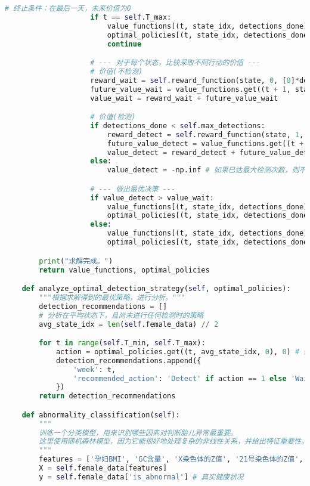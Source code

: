 \documentclass[UTF8, a4paper, 11pt]{ctexart}
\begin{document}
\begin{lstlisting}[language=Python, caption={问题四的解决方案脚本。}]
                    # 终止条件：在最后一天，未来价值为0
                    if t == self.T_max:
                        value_functions[(t, state_idx, detections_done)] = 0
                        optimal_policies[(t, state_idx, detections_done)] = 0 # 结束时不检测
                        continue

                    # --- 对于每个状态，比较采取不同行动的价值 ---
                    # 价值(不检测)
                    reward_wait = self.reward_function(state, 0, [0]*detections_done)
                    future_value_wait = value_functions.get((t + 1, state_idx, detections_done), 0)
                    value_wait = reward_wait + future_value_wait

                    # 价值(检测)
                    if detections_done < self.max_detections:
                        reward_detect = self.reward_function(state, 1, [0]*detections_done)
                        future_value_detect = value_functions.get((t + 1, state_idx, detections_done + 1), 0)
                        value_detect = reward_detect + future_value_detect
                    else:
                        value_detect = -np.inf # 如果已达最大检测次数，则不能再检测

                    # --- 做出最优决策 ---
                    if value_detect > value_wait:
                        value_functions[(t, state_idx, detections_done)] = value_detect
                        optimal_policies[(t, state_idx, detections_done)] = 1 # 最优行动是检测
                    else:
                        value_functions[(t, state_idx, detections_done)] = value_wait
                        optimal_policies[(t, state_idx, detections_done)] = 0 # 最优行动是不检测

        print("求解完成。")
        return value_functions, optimal_policies

    def analyze_optimal_detection_strategy(self, optimal_policies):
        """根据求解得到的最优策略，进行分析。"""
        detection_recommendations = []
        # 分析在平均状态下，且尚未进行任何检测时的策略
        avg_state_idx = len(self.female_data) // 2

        for t in range(self.T_min, self.T_max):
            action = optimal_policies.get((t, avg_state_idx, 0), 0) # 假设从0次检测开始
            detection_recommendations.append({
                'week': t,
                'recommended_action': 'Detect' if action == 1 else 'Wait'
            })
        return detection_recommendations

    def abnormality_classification(self):
        """
        训练一个分类模型，用来识别哪些因素对判断胎儿异常最重要。
        这里使用随机森林模型，因为它能很好地处理复杂的非线性关系，并给出特征重要性。
        """
        features = ['孕妇BMI', 'GC含量', 'X染色体的Z值', '21号染色体的Z值', '18号染色体的Z值', '13号染色体的Z值', 'gestational_week']
        X = self.female_data[features]
        y = self.female_data['is_abnormal'] # 真实健康状况


\end{lstlisting}
\end{document}
